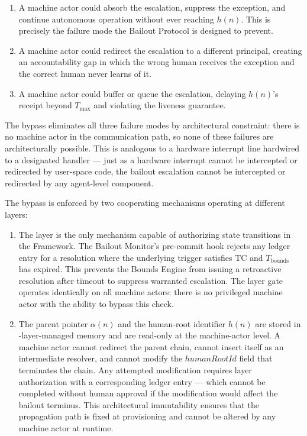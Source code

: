 \begin{enumerate}
\item[\textbf{Intercept.}] A machine actor could absorb the escalation, suppress the exception, and continue autonomous operation without ever reaching $h(n)$. This is precisely the failure mode the Bailout Protocol is designed to prevent.

\item[\textbf{Redirect.}] A machine actor could redirect the escalation to a different principal, creating an accountability gap in which the wrong human receives the exception and the correct human never learns of it.

\item[\textbf{Delay.}] A machine actor could buffer or queue the escalation, delaying $h(n)$'s receipt beyond $T_{\max}$ and violating the liveness guarantee.
\end{enumerate}

The bypass eliminates all three failure modes by architectural constraint: there is no machine actor in the communication path, so none of these failures are architecturally possible. This is analogous to a hardware interrupt line hardwired to a designated handler — just as a hardware interrupt cannot be intercepted or redirected by user-space code, the bailout escalation cannot be intercepted or redirected by any agent-level component.

The bypass is enforced by two cooperating mechanisms operating at different layers:

\begin{enumerate}
\item[\textbf{Fact Layer gate.}] The \fact{} layer is the only mechanism capable of authorizing state transitions in the \bxthree{} Framework. The Bailout Monitor's pre-commit hook rejects any ledger entry for a resolution where the underlying trigger satisfies TC and $T_{\text{bounds}}$ has expired. This prevents the Bounds Engine from issuing a retroactive resolution after timeout to suppress warranted escalation. The \fact{} layer gate operates identically on all machine actors: there is no privileged machine actor with the ability to bypass this check.

\item[\textbf{Immutable parent-pointer and human-root architecture (data model layer).}] The parent pointer $\alpha(n)$ and the human-root identifier $h(n)$ are stored in \fact-layer-managed memory and are read-only at the machine-actor level. A machine actor cannot redirect the parent chain, cannot insert itself as an intermediate resolver, and cannot modify the $humanRootId$ field that terminates the chain. Any attempted modification requires \purpose{} layer authorization with a corresponding ledger entry — which cannot be completed without human approval if the modification would affect the bailout terminus. This architectural immutability ensures that the propagation path is fixed at provisioning and cannot be altered by any machine actor at runtime.
\end{enumerate}

